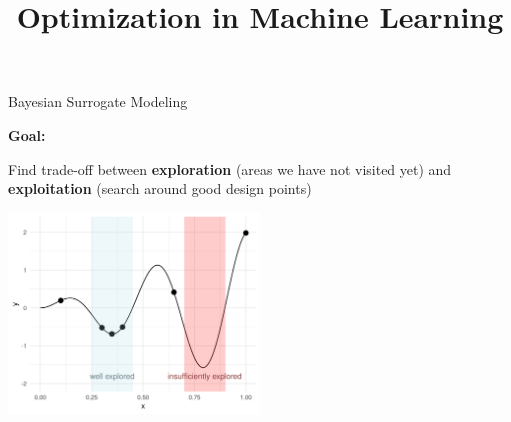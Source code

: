 \documentclass[11pt,compress,t,notes=noshow, xcolor=table]{beamer}
\title{Optimization in Machine Learning}
\date{}
\begin{document}

\begin{vbframe}{Bayesian Surrogate Modeling}

\textbf{Goal:}

Find trade-off between \textbf{exploration} (areas we have not visited yet) and \textbf{exploitation} (search around good design points)

\vspace{+.45cm}

\begin{center}
  \includegraphics[width = 0.5\textwidth]{figure_man/bayesian_loop_ee.png}
\end{center}

\framebreak 


\end{vbframe}
\end{document}

